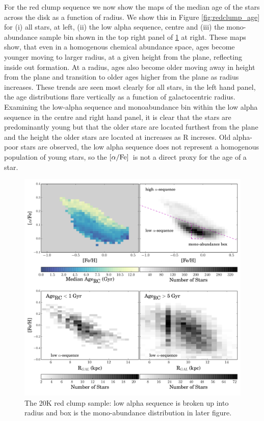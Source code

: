 \documentclass[12pt, preprint]{aastex}
\newcommand{\alphafe}{\mbox{$\rm [\alpha/Fe]$}}
\begin{document}
For the red clump sequence we now show the maps of the median age of the stars across the disk as a function of radius. We show this in Figure \ref{fig:redclump_age} for (i) all stars, at left, (ii) the low alpha sequence, centre and (iii) the mono-abundance sample bin shown in the top right panel of \ref{fig:redclump} at right. These maps show, that even in a homogenous chemical abundance space, ages become younger moving to larger radius, at a given height from the plane, reflecting inside out formation. At a radius, ages also become older moving away in height from the plane and transition to older ages higher from the plane as radius increases. These trends are seen most clearly for all stars, in the left hand panel, the age distributions flare vertically as a function of galactocentric radius. Examining the low-alpha sequence and monoabundance bin within the low alpha sequence in the centre and right hand panel, it is clear that the stars are predominantly young but that the older stare are located furthest from the plane and the height the older stars are located at increases as R increses. Old alpha-poor stars are observed, the low alpha sequence does not represent a homogenous population of young stars, so the \alphafe\ is not a direct proxy for the age of a star. 

%


\begin{figure}[p!]
\centering
 \includegraphics[scale=0.4]{./plots/redclump_4panel.pdf}
    \caption{The 20K red clump sample: low alpha sequence is broken up into radius and box is the mono-abundance distribution in later figure.}
\label{fig:redclump}
\end{figure}
\end{document}
